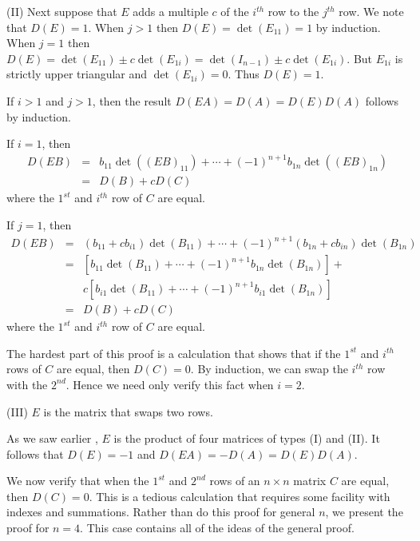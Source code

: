 \noindent (II) Next suppose that $E$ adds a multiple $c$ of the
$i^{th}$ row to the $j^{th}$ row.  We note that $D(E)=1$.  When
$j>1$ then $D(E)=\det(E_{11})=1$ by induction.  When $j=1$ then
$D(E)= \det(E_{11})\pm c\det(E_{1i})=\det(I_{n-1})\pm
c\det(E_{1i})$. But $E_{1i}$ is strictly upper triangular and
$\det(E_{1i})=0$.  Thus $D(E)=1$. 

If $i>1$ and $j>1$, then the result $D(EA)=D(A)=D(E)D(A)$
follows by induction.  

If $i=1$, then
\begin{eqnarray*}
D(EB) & = & b_{11}\det((EB)_{11})+\cdots+(-1)^{n+1}b_{1n}\det((EB)_{1n})\\
& = & D(B) + cD(C)
\end{eqnarray*}
where the $1^{st}$ and $i^{th}$ row of $C$ are equal.

If $j=1$, then 
\begin{eqnarray*}
D(EB) & = & (b_{11}+cb_{i1})\det(B_{11}) +\cdots+ 
(-1)^{n+1}(b_{1n}+cb_{in})\det(B_{1n})\\
& = &
\left[b_{11}\det(B_{11})+\cdots+(-1)^{n+1}b_{1n}\det(B_{1n})\right]
+ 
\\ & & 
        c\left[b_{i1}\det(B_{11})+\cdots+(-1)^{n+1}b_{i1}\det(B_{1n})\right]\\
& = & D(B) + cD(C)
\end{eqnarray*}
where the $1^{st}$ and $i^{th}$ row of $C$ are equal.  

The hardest part of this proof is a calculation that shows that
if the $1^{st}$ and $i^{th}$ rows of $C$ are equal, then
$D(C)=0$.  By induction, we can swap the $i^{th}$ row with the
$2^{nd}$.  Hence we need only verify this fact when $i=2$. 

\noindent (III) $E$ is the matrix that swaps two rows.   

As we saw earlier , $E$ is the product of four
matrices of types (I) and (II).  It follows that $D(E)=-1$ and
$D(EA)=-D(A)=D(E)D(A)$.  

We now verify that when the $1^{st}$ and $2^{nd}$ rows of an
$n\times n$ matrix $C$ are equal, then $D(C)=0$.  This is a
tedious calculation that requires some facility with indexes and
summations.  Rather than do this proof for general $n$, we
present the proof for $n=4$.  This case contains all of the
ideas of the general proof.  

